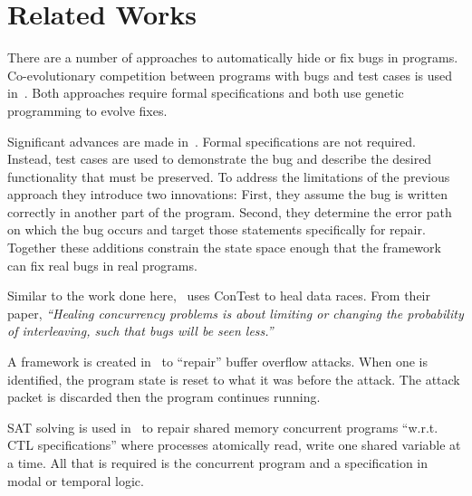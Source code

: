 \documentclass{llncs}
\begin{document}
\section{Related Works}
\label{sec:related_works}

There are a number of approaches to automatically hide or fix bugs in programs.
Co-evolutionary competition between programs with bugs and test cases is used
in~\cite{AY08, Arc08, WT10}. Both approaches require formal specifications and
both use genetic programming to evolve fixes.

Significant advances are made in~\cite{FNWG09, WNLF09, NWLF09, WFGN10,
GNFW11}. Formal specifications are not required. Instead, test cases are
used to demonstrate the bug and describe the desired functionality that must be
preserved. To address the limitations of the previous approach they introduce
two innovations: First, they assume the bug is written correctly in another
part of the program. Second, they determine the error path on which the bug
occurs and target those statements specifically for repair. Together these
additions constrain the state space enough that the framework can fix real bugs
in real programs.

Similar to the work done here,~\cite{KLT+07, LVK08} uses ConTest to heal data
races. From their paper, \textit{``Healing concurrency problems is about
limiting or changing the probability of interleaving, such that bugs will be
seen less.''}

A framework is created in~\cite{CB05} to ``repair'' buffer overflow attacks.
When one is identified, the program state is reset to what it was before the
attack. The attack packet is discarded then the program continues running.

SAT solving is used in~\cite{AY07}  to repair shared memory concurrent programs
``w.r.t. CTL specifications'' where processes atomically read, write one shared
variable at a time. All that is required is the concurrent program and a
specification in modal or temporal logic.
\end{document}
